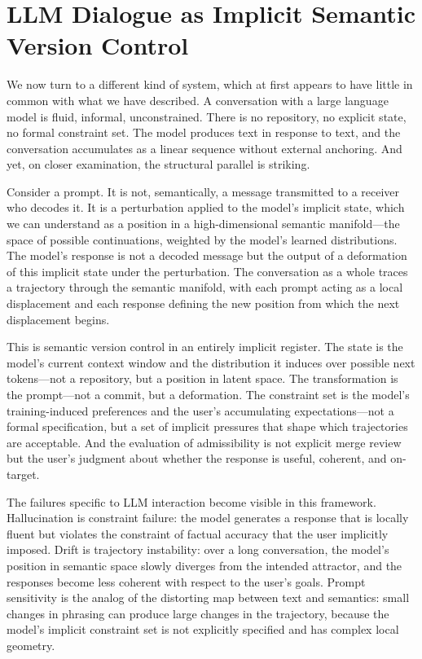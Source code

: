 \documentclass[12pt, letterpaper]{article}
\begin{document}
\section{LLM Dialogue as Implicit Semantic Version Control}

We now turn to a different kind of system, which at first appears to have little in common with what we have described. A conversation with a large language model is fluid, informal, unconstrained. There is no repository, no explicit state, no formal constraint set. The model produces text in response to text, and the conversation accumulates as a linear sequence without external anchoring. And yet, on closer examination, the structural parallel is striking.

Consider a prompt. It is not, semantically, a message transmitted to a receiver who decodes it. It is a perturbation applied to the model's implicit state, which we can understand as a position in a high-dimensional semantic manifold---the space of possible continuations, weighted by the model's learned distributions. The model's response is not a decoded message but the output of a deformation of this implicit state under the perturbation. The conversation as a whole traces a trajectory through the semantic manifold, with each prompt acting as a local displacement and each response defining the new position from which the next displacement begins.

This is semantic version control in an entirely implicit register. The state is the model's current context window and the distribution it induces over possible next tokens---not a repository, but a position in latent space. The transformation is the prompt---not a commit, but a deformation. The constraint set is the model's training-induced preferences and the user's accumulating expectations---not a formal specification, but a set of implicit pressures that shape which trajectories are acceptable. And the evaluation of admissibility is not explicit merge review but the user's judgment about whether the response is useful, coherent, and on-target.

The failures specific to LLM interaction become visible in this framework. Hallucination is constraint failure: the model generates a response that is locally fluent but violates the constraint of factual accuracy that the user implicitly imposed. Drift is trajectory instability: over a long conversation, the model's position in semantic space slowly diverges from the intended attractor, and the responses become less coherent with respect to the user's goals. Prompt sensitivity is the analog of the distorting map between text and semantics: small changes in phrasing can produce large changes in the trajectory, because the model's implicit constraint set is not explicitly specified and has complex local geometry.
\end{document}
